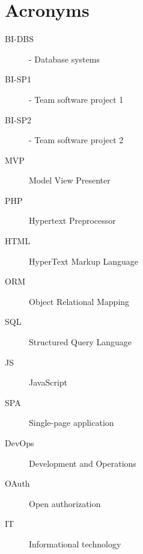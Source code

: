 \chapter{Acronyms}
\begin{description}
   \item[BI-DBS] - Database systems
   \item[BI-SP1] - Team software project 1
   \item[BI-SP2] - Team software project 2
   \item[MVP] Model View Presenter
   \item[PHP] Hypertext Preprocessor
   \item[HTML] HyperText Markup Language
   \item[ORM] Object Relational Mapping
   \item[SQL] Structured Query Language
   \item[JS] JavaScript
   \item[SPA] Single-page application
   \item[DevOps] Development and Operations
   \item[OAuth] Open authorization
   \item[IT] Informational technology
\end{description}

